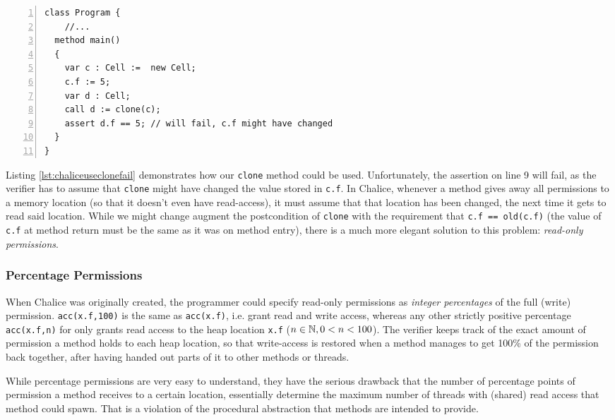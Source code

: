 \begin{lstlisting}[float,language=Chalice,caption={Calling \lstinline!Program::clone! (extension of Listing \ref{lst:chaliceexampleaccnew})},label={lst:chaliceuseclonefail},numbers=left]
class Program {  
	//...
  method main()
  {
    var c : Cell :=  new Cell;
    c.f := 5;
    var d : Cell;
    call d := clone(c);
    assert d.f == 5; // will fail, c.f might have changed
  }
}
\end{lstlisting}

Listing \ref{lst:chaliceuseclonefail} demonstrates how our \lstinline!clone! method could be used. 
Unfortunately, the assertion on line 9 will fail, as the verifier has to assume that \lstinline!clone! might have changed the value stored in \lstinline!c.f!.
In Chalice, whenever a method gives away all permissions to a memory location (so that it doesn't even have read-access), it must assume that that location has been changed, the next time it gets to read said location.
While we might change augment the postcondition of \lstinline!clone! with the requirement that \lstinline!c.f == old(c.f)! (the value of \lstinline!c.f! at method return must be the same as it was on method entry), there is a much more elegant solution to this problem: \emph{read-only permissions}.

\subsubsection{Percentage Permissions}
When Chalice was originally created, the programmer could specify read-only permissions as \emph{integer percentages} of the full (write) permission. 
\lstinline!acc(x.f,100)! is the same as \lstinline!acc(x.f)!, i.e. grant read and write access, whereas any other strictly positive percentage \lstinline!acc(x.f,n)! for only grants read access to the heap location \lstinline!x.f! ($n\in\mathbb{N}, 0 < n < 100$).
The verifier keeps track of the exact amount of permission a method holds to each heap location, so that write-access is restored when a method manages to get 100\% of the permission back together, after having handed out parts of it to other methods or threads.

While percentage permissions are very easy to understand, they have the serious drawback that the number of percentage points of permission a method receives to a certain location, essentially determine the maximum number of threads with (shared) read access that method could spawn.
That is a violation of the procedural abstraction that methods are intended to provide.


